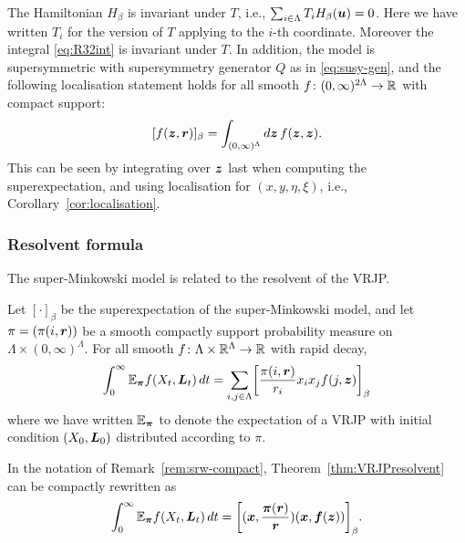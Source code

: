 \documentclass[11pt,a4paper]{article}
\begin{document}
The Hamiltonian $H_{\beta}$ is invariant under $T$, i.e.,
$\sum_{i\in\Lambda}T_i H_\beta(\boldsymbol{u}) = 0$.  Here we have written
$T_i$ for the version of $T$ applying to the $i$-th coordinate.
Moreover the integral \eqref{eq:R32int} is invariant under $T$.  In
addition, the model is supersymmetric with supersymmetry generator $Q$
as in \eqref{eq:susy-gen}, and the following localisation statement
holds for all smooth $f\colon (0,\infty)^{2\Lambda} \to \mathbb{R}$ with
compact support:
\begin{equation} \label{e:Minkowski-localisation}
  [f(\boldsymbol{z},\boldsymbol{r})]_\beta = \int_{(0,\infty)^{\Lambda}} d\boldsymbol{z}\, f(\boldsymbol{z}, \boldsymbol{z}).
\end{equation}
This can be seen by integrating over $\boldsymbol{z}$ last when computing
the superexpectation, and using localisation for $(x,y,\eta,\xi)$, i.e.,
Corollary~\ref{cor:localisation}.


\subsubsection{Resolvent formula}
The super-Minkowski model is related to the resolvent of the VRJP.

\begin{theorem} \label{thm:VRJPresolvent} Let $[\cdot]_{\beta}$ be the
  superexpectation of the super-Minkowski model, and let
  $\pi = (\pi(i,\boldsymbol{r}))$ be a smooth compactly support probability
  measure on $\Lambda \times (0,\infty)^\Lambda$.
  For all smooth $f\colon\Lambda\times\mathbb{R}^{\Lambda}\to\mathbb{R}$ with rapid decay,
  \begin{equation}
    \label{e:VRJPresolvent}
    \int_{0}^{\infty} \E_{\V{\pi}} f(X_{t},\V{L}_{t})\, dt
    =
    \sum_{i,j\in\Lambda}\cb{\frac{\pi(i,\V{r})}{r_i}x_{i}x_{j}  f(j,\V{z})}_{\beta}
  \end{equation}
  where we have written $\mathbb{E}_{\boldsymbol{\pi}}$ to denote the expectation of
  a VRJP with initial condition $(X_{0},\boldsymbol{L}_{0})$ distributed according to $\pi$.
\end{theorem}

\begin{remark}
  \label{rem:resolve-compact}
  In the notation of Remark~\ref{rem:srw-compact},
  Theorem~\ref{thm:VRJPresolvent} can be compactly rewritten as
  \begin{equation}
    \label{e:VRJPresolvent1}
    \int_{0}^{\infty} \E_{\V{\pi}} f(X_{t},\V{L}_{t})\, dt
    =
    \cb{(\V{x}, \frac{\V{\pi}(\V{r})}{\V{r}})(\V{x},
      \V{f}(\V{z}))}_{\beta}.
  \end{equation}
\end{remark}
\end{document}
